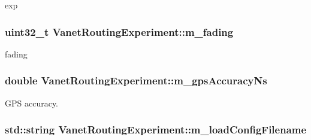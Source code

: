 exp 

\subsubsection[{\texorpdfstring{m\+\_\+fading}{m_fading}}]{\setlength{\rightskip}{0pt plus 5cm}uint32\+\_\+t Vanet\+Routing\+Experiment\+::m\+\_\+fading\hspace{0.3cm}{\ttfamily [private]}}\hypertarget{classVanetRoutingExperiment_acdcef1359860a9bc93e678e15080544f}{}\label{classVanetRoutingExperiment_acdcef1359860a9bc93e678e15080544f}


fading 

\subsubsection[{\texorpdfstring{m\+\_\+gps\+Accuracy\+Ns}{m_gpsAccuracyNs}}]{\setlength{\rightskip}{0pt plus 5cm}double Vanet\+Routing\+Experiment\+::m\+\_\+gps\+Accuracy\+Ns\hspace{0.3cm}{\ttfamily [private]}}\hypertarget{classVanetRoutingExperiment_a93d058dcc4a02c67de923ab6a1d8bf85}{}\label{classVanetRoutingExperiment_a93d058dcc4a02c67de923ab6a1d8bf85}


G\+PS accuracy. 

\subsubsection[{\texorpdfstring{m\+\_\+load\+Config\+Filename}{m_loadConfigFilename}}]{\setlength{\rightskip}{0pt plus 5cm}std\+::string Vanet\+Routing\+Experiment\+::m\+\_\+load\+Config\+Filename\hspace{0.3cm}{\ttfamily [private]}}\hypertarget{classVanetRoutingExperiment_a56e00537f102a206011e18df57caf6c0}{}\label{classVanetRoutingExperiment_a56e00537f102a206011e18df57caf6c0}


